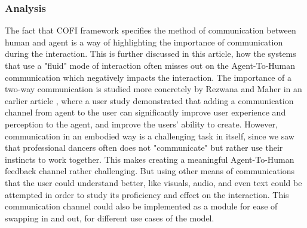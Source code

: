 \documentclass[final,5p,times,twocolumn,authoryear]{article}
\begin{document}
\subsubsection{Analysis}

The fact that COFI framework specifies the method of communication
between human and agent is a way of highlighting the importance of
communication during the interaction. This is further discussed in this
article, how the systems that use a "fluid" mode of interaction often
misses out on the Agent-To-Human communication which negatively impacts
the interaction. The importance of a two-way communication is studied
more concretely by Rezwana and Maher in an earlier article
\cite{Rezwana2022}, where a user study demonstrated that adding a
communication channel from agent to the user can significantly improve
user experience and perception to the agent, and improve the users'
ability to create. However, communication in an embodied way is a
challenging task in itself, since we saw that professional dancers often
does not "communicate" but rather use their instincts to work together.
This makes creating a meaningful Agent-To-Human feedback channel rather
challenging. But using other means of communications that the user could
understand better, like visuals, audio, and even text could be attempted
in order to study its proficiency and effect on the interaction.  This
communication channel could also be implemented as a module for ease of
swapping in and out, for different use cases of the model.
\end{document}
